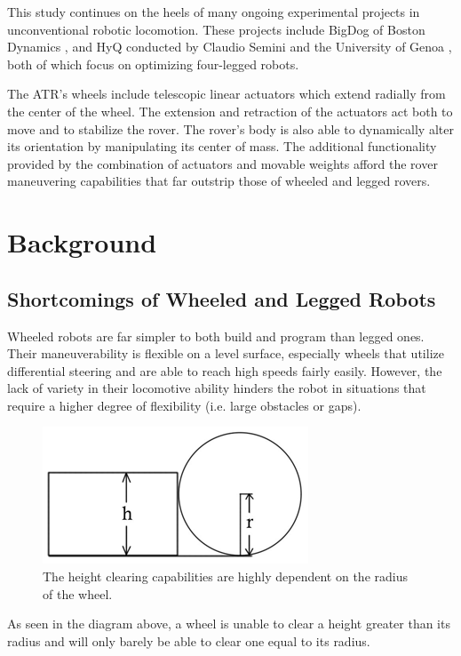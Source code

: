 \documentclass[12pt]{article}
\numberwithin{figure}{section}
\begin{document}
\begin{multicols}{2}
This study continues on the heels of many ongoing experimental projects in unconventional robotic locomotion. These projects include BigDog of Boston Dynamics \cite{raibert-bigdog}, and HyQ conducted by Claudio Semini and the University of Genoa \cite{semini-hyq}, both of which focus on optimizing four-legged robots.

The ATR’s wheels include telescopic linear actuators which extend radially from the center of the wheel. The extension and retraction of the actuators act both to move and to stabilize the rover. The rover’s body is also able to dynamically alter its orientation by manipulating its center of mass. The additional functionality provided by the combination of actuators and movable weights afford the rover maneuvering capabilities that far outstrip those of wheeled and legged rovers.
\section{Background}
\subsection{Shortcomings of Wheeled and Legged Robots}
Wheeled robots are far simpler to both build and program than legged ones. Their maneuverability is flexible on a level surface, especially wheels that utilize differential steering and are able to reach high speeds fairly easily.  However, the lack of variety in their locomotive ability hinders the robot in situations that require a higher degree of flexibility (i.e. large obstacles or gaps).

\begin{figure}[H]
\includegraphics{Height_Limit.PNG}
\caption{The height clearing capabilities are highly dependent on the radius of the wheel. \cite{sanzari-telescopic-actuator}}
\label{fig:height_limit}
\end{figure}

As seen in the diagram above, a wheel is unable to clear a height greater than its radius and will only barely be able to clear one equal to its radius. 


\end{multicols}
\end{document}
